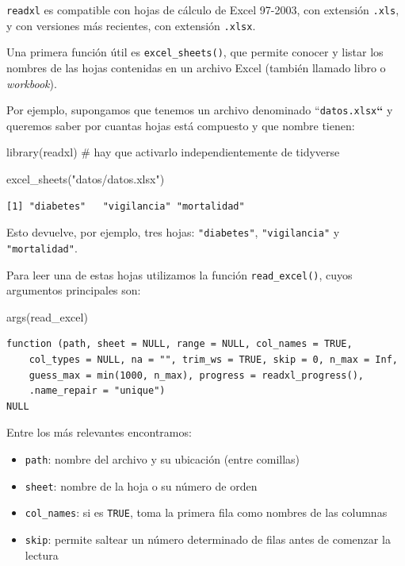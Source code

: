 \documentclass[
  spanish,
  a4paper,
]{scrbook}
\newenvironment{Shaded}{\begin{snugshade}}{\end{snugshade}}
\newcommand{\CommentTok}[1]{\textcolor[rgb]{0.37,0.37,0.37}{#1}}
\newcommand{\FunctionTok}[1]{\textcolor[rgb]{0.28,0.35,0.67}{#1}}
\newcommand{\NormalTok}[1]{\textcolor[rgb]{0.00,0.23,0.31}{#1}}
\newcommand{\StringTok}[1]{\textcolor[rgb]{0.13,0.47,0.30}{#1}}
\begin{document}
\texttt{readxl} es compatible con hojas de cálculo de Excel 97-2003, con
extensión \texttt{.xls}, y con versiones más recientes, con extensión
\texttt{.xlsx}.

Una primera función útil es \texttt{excel\_sheets()}, que permite
conocer y listar los nombres de las hojas contenidas en un archivo Excel
(también llamado libro o \emph{workbook}).

Por ejemplo, supongamos que tenemos un archivo denominado
``\texttt{datos.xlsx}\textbf{``} y queremos saber por cuantas hojas está
compuesto y que nombre tienen:

\begin{Shaded}
\begin{Highlighting}[]
\FunctionTok{library}\NormalTok{(readxl) }\CommentTok{\# hay que activarlo independientemente de tidyverse}

\FunctionTok{excel\_sheets}\NormalTok{(}\StringTok{"datos/datos.xlsx"}\NormalTok{)}
\end{Highlighting}
\end{Shaded}

\begin{verbatim}
[1] "diabetes"   "vigilancia" "mortalidad"
\end{verbatim}

Esto devuelve, por ejemplo, tres hojas: \texttt{"diabetes"},
\texttt{"vigilancia"} y \texttt{"mortalidad"}.

Para leer una de estas hojas utilizamos la función
\texttt{read\_excel()}, cuyos argumentos principales son:

\begin{Shaded}
\begin{Highlighting}[]
\FunctionTok{args}\NormalTok{(read\_excel)}
\end{Highlighting}
\end{Shaded}

\begin{verbatim}
function (path, sheet = NULL, range = NULL, col_names = TRUE, 
    col_types = NULL, na = "", trim_ws = TRUE, skip = 0, n_max = Inf, 
    guess_max = min(1000, n_max), progress = readxl_progress(), 
    .name_repair = "unique") 
NULL
\end{verbatim}

Entre los más relevantes encontramos:

\begin{itemize}
\item
  \texttt{path}: nombre del archivo y su ubicación (entre comillas)
\item
  \texttt{sheet}: nombre de la hoja o su número de orden
\item
  \texttt{col\_names}: si es \texttt{TRUE}, toma la primera fila como
  nombres de las columnas
\item
  \texttt{skip}: permite saltear un número determinado de filas antes de
  comenzar la lectura
\end{itemize}
\end{document}
